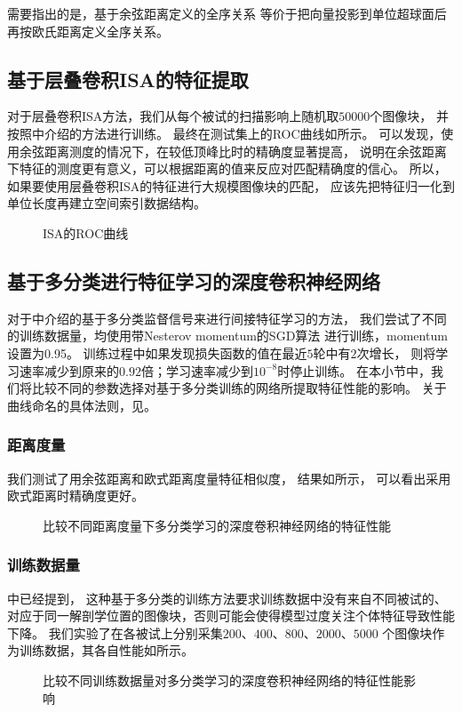 需要指出的是，基于余弦距离定义的全序关系
等价于把向量投影到单位超球面后再按欧氏距离定义全序关系。

\subsection{基于层叠卷积ISA的特征提取\label{sec:expr:isa}}
对于层叠卷积ISA方法，我们从每个被试的扫描影响上随机取$50000$个图像块，
并按照中介绍的方法进行训练。
最终在测试集上的ROC曲线如所示。
可以发现，使用余弦距离测度的情况下，在较低顶峰比时的精确度显著提高，
说明在余弦距离下特征的测度更有意义，可以根据距离的值来反应对匹配精确度的信心。
所以，如果要使用层叠卷积ISA的特征进行大规模图像块的匹配，
应该先把特征归一化到单位长度再建立空间索引数据结构。

\begin{figure}[H]
    \caption{ISA的ROC曲线}
    \label{fig:expr:curve:ISA}
\end{figure}

\subsection{基于多分类进行特征学习的深度卷积神经网络\label{sec:expr:clsfy}}
对于中介绍的基于多分类监督信号来进行间接特征学习的方法，
我们尝试了不同的训练数据量，均使用带Nesterov momentum的SGD算法
\cite{sutskever2013importance}进行训练，momentum设置为0.95。
训练过程中如果发现损失函数的值在最近$5$轮中有$2$次增长，
则将学习速率减少到原来的$0.92$倍；学习速率减少到$10^{-8}$时停止训练。
在本小节中，我们将比较不同的参数选择对基于多分类训练的网络所提取特征性能的影响。
关于曲线命名的具体法则，见。

\subsubsection{距离度量}
我们测试了用余弦距离和欧式距离度量特征相似度，
结果如所示，
可以看出采用欧式距离时精确度更好。

\begin{figure}[H]
    \caption{比较不同距离度量下多分类学习的深度卷积神经网络的特征性能}
    \label{fig:expr:curve:clsfy:measure}
\end{figure}

\subsubsection{训练数据量}
中已经提到，
这种基于多分类的训练方法要求训练数据中没有来自不同被试的、
对应于同一解剖学位置的图像块，否则可能会使得模型过度关注个体特征导致性能下降。
我们实验了在各被试上分别采集$200$、$400$、$800$、$2000$、$5000$
个图像块作为训练数据，其各自性能如所示。
\begin{figure}[H]
    \caption{比较不同训练数据量对多分类学习的深度卷积神经网络的特征性能影响}
    \label{fig:expr:curve:clsfy:datasize}
\end{figure}

